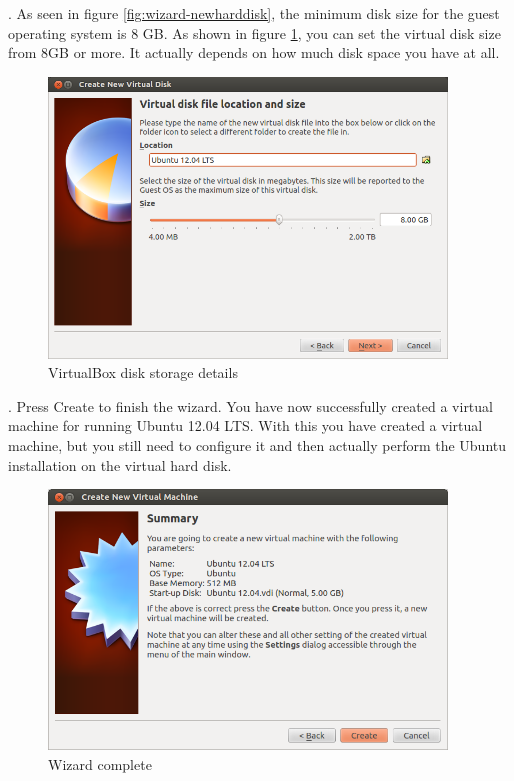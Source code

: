 \newpage
\par {}. As seen in figure \ref{fig:wizard-newharddisk}, the minimum disk size for the guest operating system is 8 GB. As shown in figure \ref{fig:wizard-sizelocation}, you can set the virtual disk size from 8GB or more.  It actually depends on how much disk space you have at all.  \\

\begin{figure}[!h]	
	\centering
	\includegraphics[width=300pt]{./images/installation/virtualbox/wizard-sizelocation.png}
	\caption{VirtualBox disk storage details}	
	\label{fig:wizard-sizelocation}	
\end{figure}

\par {}. Press Create to finish the wizard. You have now successfully created a virtual machine for running Ubuntu 12.04 LTS. With this you have created a virtual machine, but you still need to configure it and then actually perform the Ubuntu installation on the virtual hard disk.\\

\begin{figure}[!h]	
	\centering
	\includegraphics[width=300pt]{./images/installation/virtualbox/Wizard-complete.png}
	\caption{Wizard complete}	
	\label{fig:Wizard-complete}	
\end{figure}

